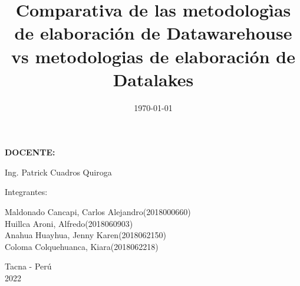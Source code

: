 \documentclass[twoside,twocolumn]{article}
\begin{document}
\begin{titlepage}
\begin{center}
\vspace*{0.3in}
\begin{Large}
\textbf{DOCENTE:} \\
\end{Large}

\vspace*{0.1in}
\begin{large}
 Ing. Patrick Cuadros Quiroga\\
\end{large}

\vspace*{0.2in}
\vspace*{0.1in}
\begin{large}

Integrantes: \\
\begin{flushleft}
Maldonado Cancapi, Carlos Alejandro\hfill(2018000660) \\
Huillca Aroni, Alfredo\hfill(2018060903)\\
Anahua Huayhua, Jenny Karen\hfill(2018062150)\\
Coloma Colquehuanca, Kiara\hfill(2018062218)\\

\end{flushleft}
\end{large}

\vspace*{0.1in}
\begin{large}
Tacna - Perú\\
2022
\end{large}
\end{center}
\end{titlepage}

\setlength{\droptitle}{-4\baselineskip} %

\pretitle{\begin{center}\Huge\bfseries} %
\posttitle{\end{center}} %
\title{Comparativa de las metodologìas de elaboración de Datawarehouse vs metodologias de elaboración de Datalakes} %

\date{\today} %
\renewcommand{\maketitlehookd}{%

}

\end{document}
